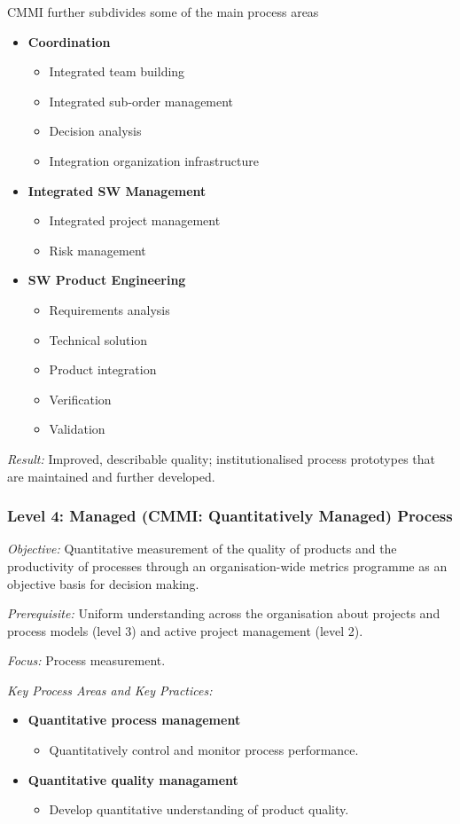 \documentclass[11pt,a4paper]{article}
\begin{document}
CMMI further subdivides some of the main process areas
\begin {itemize} 
\item \textbf {Coordination}
  \begin {itemize} 
  \item Integrated team building
  \item Integrated sub-order management
  \item Decision analysis
  \item Integration organization infrastructure
  \end {itemize}
\item \textbf {Integrated SW Management}
  \begin {itemize} 
  \item Integrated project management
  \item Risk management
  \end {itemize}
\item \textbf {SW Product Engineering}
  \begin {itemize} 
  \item Requirements analysis
  \item Technical solution
  \item Product integration
  \item Verification
  \item Validation
  \end {itemize}
\end {itemize}

\emph{Result:} Improved, describable quality; institutionalised process
prototypes that are maintained and further developed.

\subsubsection*{Level 4: Managed (CMMI: Quantitatively Managed) Process}

\emph{Objective:} Quantitative measurement of the quality of products and the
productivity of processes through an organisation-wide metrics programme as an
objective basis for decision making.

\emph{Prerequisite:} Uniform understanding across the organisation about
projects and process models (level 3) and active project management (level 2).

\emph{Focus:} Process measurement.

\emph{Key Process Areas and Key Practices:}
\begin{itemize}
\item \textbf{Quantitative process management}
  \begin{itemize}
  \item Quantitatively control and monitor process performance.
  \end{itemize}
\item \textbf{Quantitative quality managament}
  \begin{itemize}
  \item  Develop quantitative understanding of product quality.
  \end{itemize}
\end{itemize}
\end{document}
